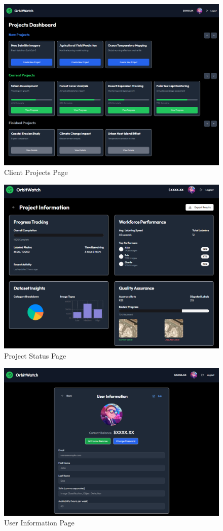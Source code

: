 \documentclass[12pt, titlepage]{article}
\begin{document}
\begin{figure}[H]
    \centering
    \includegraphics[scale=0.25]{client_projects.png}
    \caption{Client Projects Page}
\end{figure}
\begin{figure}[H]
    \centering
    \includegraphics[scale=0.4]{project_stats.png}
    \caption{Project Status Page}
\end{figure}
\begin{figure}[H]
    \centering
    \includegraphics[scale=0.4]{user_info.png}
    \caption{User Information Page}
\end{figure}
\end{document}
